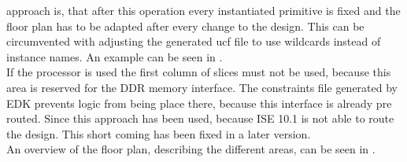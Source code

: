 \documentclass[11pt,technote,a4paper,onecolumn,dvips]{IEEEtran}
\begin{document}
approach is, that after this operation every instantiated primitive
is fixed and the floor plan has to be adapted after every change to the
design. This can be circumvented with adjusting the generated ucf file
to use wildcards instead of instance names. An example can be seen in
.\\
If the processor is used the first column of slices must not be used, because
this area is reserved for the DDR memory interface. The constraints file
generated by EDK prevents logic from being place there, because this interface
is already pre routed. Since this approach has been used, because ISE 10.1 is
not able to route the design. This short coming has been fixed in a later
version.\\
An overview of the floor plan, describing the different areas, can be seen in
.
\end{document}
